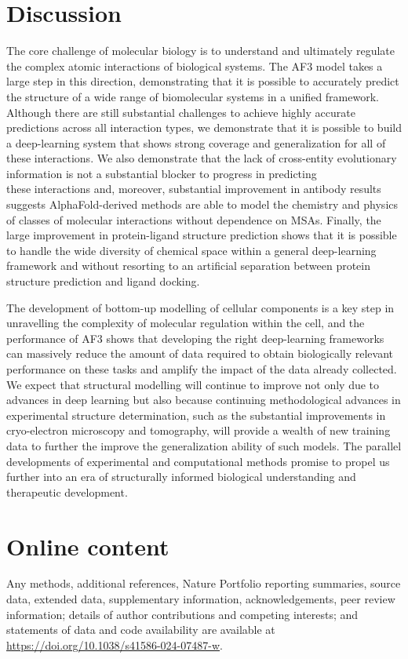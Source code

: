 \documentclass[10pt]{article}
\begin{document}
\section*{Discussion}
The core challenge of molecular biology is to understand and ultimately regulate the complex atomic interactions of biological systems. The AF3 model takes a large step in this direction, demonstrating that it is possible to accurately predict the structure of a wide range of biomolecular systems in a unified framework. Although there are still substantial challenges to achieve highly accurate predictions across all interaction types, we demonstrate that it is possible to build a deep-learning system that shows strong coverage and generalization for all of these interactions. We also demonstrate that the lack of cross-entity evolutionary information is not a substantial blocker to progress in predicting\\
these interactions and, moreover, substantial improvement in antibody results suggests AlphaFold-derived methods are able to model the chemistry and physics of classes of molecular interactions without dependence on MSAs. Finally, the large improvement in protein-ligand structure prediction shows that it is possible to handle the wide diversity of chemical space within a general deep-learning framework and without resorting to an artificial separation between protein structure prediction and ligand docking.

The development of bottom-up modelling of cellular components is a key step in unravelling the complexity of molecular regulation within the cell, and the performance of AF3 shows that developing the right deep-learning frameworks can massively reduce the amount of data required to obtain biologically relevant performance on these tasks and amplify the impact of the data already collected. We expect that structural modelling will continue to improve not only due to advances in deep learning but also because continuing methodological advances in experimental structure determination, such as the substantial improvements in cryo-electron microscopy and tomography, will provide a wealth of new training data to further the improve the generalization ability of such models. The parallel developments of experimental and computational methods promise to propel us further into an era of structurally informed biological understanding and therapeutic development.

\section*{Online content}
Any methods, additional references, Nature Portfolio reporting summaries, source data, extended data, supplementary information, acknowledgements, peer review information; details of author contributions and competing interests; and statements of data and code availability are available at \href{https://doi.org/10.1038/s41586-024-07487-w}{https://doi.org/10.1038/s41586-024-07487-w}.
\end{document}
